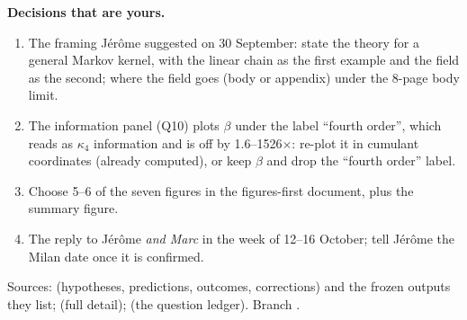 \documentclass[11pt,a4paper]{article}
\begin{document}
\textbf{Decisions that are yours.}
\begin{enumerate}[leftmargin=1.6em]
\item The framing Jérôme suggested on 30 September: state the theory for a general Markov kernel, with the linear chain as the first
example and the field as the second; where the field goes (body or appendix) under the 8-page body limit.
\item The information panel (Q10) plots $\beta$ under the label ``fourth order'', which reads as $\kappa_4$ information and is off by
1.6--1526$\times$: re-plot it in cumulant coordinates (already computed), or keep $\beta$ and drop the ``fourth order'' label.
\item Choose 5--6 of the seven figures in the figures-first document, plus the summary figure.
\item The reply to Jérôme \emph{and Marc} in the week of 12--16 October; tell Jérôme the Milan date once it is confirmed.
\end{enumerate}

\medskip
{\footnotesize\color{gray}\raggedright Sources:  (hypotheses, predictions, outcomes, corrections)
and the frozen outputs they list;  (full detail);
 (the question ledger). Branch .\par}
\end{document}
